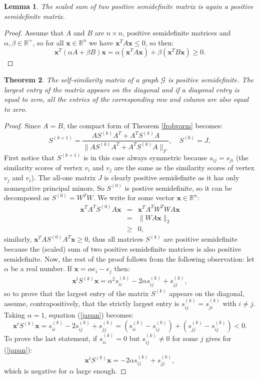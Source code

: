 \documentclass[a4paper,11pt]{report}
\newtheorem{theorem}{Theorem}[section]
\newtheorem{lemma}[theorem]{Lemma}
\newcommand{\R}{{\mathbb R}}
\newcommand{\graf}{\mathscr{G}}
\begin{document}
\begin{lemma}
  The scaled sum of two positive semidefinite matrix is again a positive semidefinite matrix.
\end{lemma}
\begin{proof}
  Assume that $A$ and $B$ are $n\times n$, positive semidefinite matrices and $\alpha, \beta \in \R^{+}$, so for all $\mathbf{x} \in 
  \R^n$ we have $\mathbf{x}^T A \mathbf{x} \leq 0$, so then:
  $$\mathbf{x}^T (\alpha A + \beta B) \mathbf{x} = \alpha (\mathbf{x}^T  A  \mathbf{x}) + \beta (\mathbf{x}^T B \mathbf{x}) 
  \geq 0.$$
\end{proof}
\begin{theorem}
  The self-similarity matrix of a graph $\graf$ is positive semidefinite. The largest entry of the matrix appears on the 
diagonal and if a diagonal entry is equal to zero,  all the entries of the corresponding row and 
column are also equal to zero.
\end{theorem}
\begin{proof}
  Since $A = B$, the compact form of Theorem \ref{frobvorm} becomes:
 $$S^{(k+1)} = \frac{AS^{(k)}A^T + A^TS^{(k)}A}{\|AS^{(k)}A^T + A^TS^{(k)}A\|_F}, \quad S^{(0)} = J,  $$
  First notice that $S^{(k+1)}$ is in this case always symmetric because $s_{ij} = s_{ji}$ (the similarity scores of vertex $v_i$ and $v_j$
  are the same as the similarity scores of vertex $v_j$ and $v_i$). The all-one matrix $J$ is clearly 
  positive semidefinite
  as it has only nonnegative principal minors. So $S^{(0)}$ is postive semidefinite, so it can be decomposed as 
  $S^{(0)} = W^T W$. We write for some vector $\mathbf{x} \in \R^n$:
  \begin{eqnarray*}
    \mathbf{x}^T A^T S^{(0)} A \mathbf{x} &=&  \mathbf{x}^T A^T W^T W A \mathbf{x}\\
    &=& \|W A \mathbf{x}\|_2\\
    & \geq & 0,
  \end{eqnarray*}  
  similarly, $\mathbf{x}^T A S^{(0)} A^T \mathbf{x} \geq 0$, thus all matrices $S^{(k)}$ 
  are positive semidefinite because the (scaled) sum of two positive 
  semidefinite matrices is also positive semidefinite. Now, the rest of the 
  proof follows from the following observation: let $\alpha$ be a real number. If 
  $\mathbf{x} = \alpha e_i - e_j$ then:
  \begin{eqnarray}\mathbf{x}^t S^{(k)} \mathbf{x} = \alpha^2 s^{(k)}_{ii} - 2\alpha s^{(k)}_{ij} 
  +  s^{(k)}_{jj}\label{japan},
  \end{eqnarray}
  so to prove that the largest entry of the matrix $S^{(k)}$ appears on the 
  diagonal, assume, contrapositively, that the strictly largest entry is $s^{(k)}_{ij} = s^{(k)}_{ji}$ with $i \not = j$. Taking 
  $\alpha = 1$, equation (\ref{japan}) becomes:
  $$\mathbf{x}^t S^{(k)} \mathbf{x} =  s^{(k)}_{ii} - 2 s^{(k)}_{ij} 
  +  s^{(k)}_{jj} = (s^{(k)}_{ii} - s^{(k)}_{ij}) + (s^{(k)}_{jj} - s^{(k)}_{ij}) 
  < 0.$$
  To prove the last statement,  if $s^{(k)}_{ii} = 0$ but $s^{(k)}_{ij} \not = 
  0$ for some $j$ gives for (\ref{japan}):
  $$\mathbf{x}^t S^{(k)} \mathbf{x} = - 2\alpha s^{(k)}_{ij} 
  +  s^{(k)}_{jj},$$
which is negative for $\alpha$ large enough. 
  
\end{proof}
\end{document}
